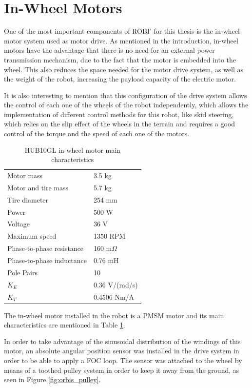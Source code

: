 \section{In-Wheel Motors}\label{section:inwheel}

One of the most important components of ROBI' for this thesis is the in-wheel motor system used as motor drive. As mentioned in the introduction, in-wheel motors have the advantage that there is no need for an external power transmission mechanism, due to the fact that the motor is embedded into the wheel. This also reduces the space needed for the motor drive system, as well as the weight of the robot, increasing the payload capacity of the electric motor.

It is also interesting to mention that this configuration of the drive system allows the control of each one of the wheels of the robot independently, which allows the implementation of different control methods for this robot, like skid steering, which relies on the slip effect of the wheels in the terrain and requires a good control of the torque and the speed of each one of the motors.

\begin{table}[]
\centering
\caption{HUB10GL in-wheel motor main characteristics}
\label{table:hub10}
\begin{tabular}{@{}ll@{}}
\toprule
Motor mass                & 3.5 kg   \\
Motor and tire mass       & 5.7 kg   \\
Tire diameter             & 254 mm   \\ 
Power                     & 500 W    \\
Voltage                   & 36 V     \\
Maximum speed             & 1350 RPM \\
Phase-to-phase resistance & 160 m$\Omega$\\
Phase-to-phase inductance & 0.76 mH \\
Pole Pairs				  & 10		\\
$K_{E}$					  & 0.36 V/(rad/s) \\
$K_{T}$					  & 0.4506 Nm/A \\
\bottomrule
\end{tabular}
\end{table}

The in-wheel motor installed in the robot is a \ac{PMSM} motor and its main characteristics are mentioned in Table \ref{table:hub10}. 

In order to take advantage of the sinusoidal distribution of the windings of this motor, an absolute angular position sensor was installed in the drive system in order to be able to apply a \ac{FOC} loop. The sensor was attached to the wheel by means of a toothed pulley system in order to keep it away from the ground, as seen in Figure \ref{fig:orbis_pulley}.

